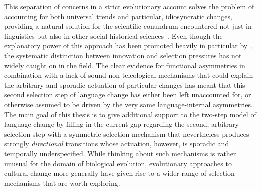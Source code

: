 This separation of concerns in a strict evolutionary account solves the problem of accounting for both universal trends and particular, idiosyncratic changes, providing a natural solution for the scientific conundrum encountered not just in linguistics but also in other social historical sciences~\citep{Blute1997}. Even though the explanatory power of this approach has been promoted heavily in particular by~\citet{Croft2000,Croft2006,Croft2008}, the systematic distinction between innovation and selection pressures has not widely caught on in the field. The clear evidence for functional asymmetries in combination with a lack of sound non-teleological mechanisms that could explain the arbitrary and sporadic actuation of particular changes has meant that this second selection step of language change has either been left unaccounted for, or otherwise assumed to be driven by the very same language-internal asymmetries.
The main goal of this thesis is to give additional support to the two-step model of language change by filling in the current gap regarding the second, arbitrary selection step with a symmetric selection mechanism that nevertheless produces strongly \emph{directional} transitions whose actuation, however, is sporadic and temporally underspecified.
While thinking about such mechanisms is rather unusual for the domain of biological evolution, evolutionary approaches to cultural change more generally have given rise to a wider range of selection mechanisms that are worth exploring.




